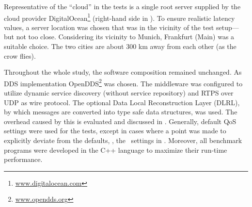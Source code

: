 Representative of the ``cloud'' in the tests is a single root server supplied by the cloud provider DigitalOcean\footnote{\url{www.digitalocean.com}} (right-hand side in ). To ensure realistic latency values, a server location was chosen that was in the vicinity of the test setup---but not too close. Considering its vicinity to Munich, Frankfurt (Main) was a suitable choice. The two cities are about 300 km away from each other (as the crow flies).

Throughout the whole study, the software composition remained unchanged. As DDS implementation OpenDDS\footnote{\url{www.opendds.org}} was chosen. The middleware was configured to utilize dynamic service discovery (without service repository) and RTPS over UDP as wire protocol. The optional Data Local Reconstruction Layer (DLRL), by which messages are converted into type safe data structures, was used. The overhead caused by this is evaluated and discussed in . Generally, default QoS settings were used for the tests, except in cases where a point was made to explicitly deviate from the defaults, \eg , the \liveliness\ settings in . Moreover, all benchmark programs were developed in the C++ language to maximize their run-time performance.


